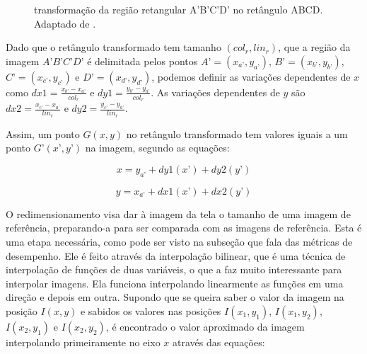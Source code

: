 
\begin{figure}[h]
  \centering
  \hfill
  \caption{transformação da região retangular A'B'C'D' no retângulo ABCD. Adaptado de \cite{inspect}.}
  \label{redimens}
\end{figure} 


Dado que o retângulo transformado tem tamanho $(col_r,lin_r)$, que a região da imagem $A’B’C’D’$ é delimitada pelos pontos $A’ = (x_{a’},y_{a’})$, $B’ = (x_{b’},y_{b’})$, $C’ = (x_{c’},y_{c’})$ e $D’ = (x_{d’},y_{d’})$, podemos definir as variações dependentes de $x$ como $dx1 = \frac{x_{b’}-x_{a’}}{col_r}$ e $dy1 = \frac{y_{b’}-y_{a’}}{col_r}$. As variações dependentes de $y$ são $dx2 = \frac{x_{c’}-x_{a’}}{lin_r}$ e $dy2 = \frac{y_{c’}-y_{a’}}{lin_r}$.


Assim, um ponto $G(x,y)$ no retângulo transformado tem valores iguais a um ponto $G’(x’,y’)$ na imagem, segundo as equações:

$$ x = y_{a’} + dy1(x’) + dy2(y’) $$

$$ y = x_{a’} + dx1(x’) + dx2(y’) $$

O redimensionamento visa dar à imagem da tela o tamanho de uma imagem de referência, preparando-a para ser comparada com as imagens de referência. Esta é uma etapa necessária, como pode ser visto na subseção que fala das métricas de desempenho. Ele é feito através da interpolação bilinear, que é uma técnica de interpolação de funções de duas variáveis, o que a faz muito interessante para interpolar imagens.
Ela funciona interpolando linearmente as funções em uma direção e depois em outra. Supondo que se queira saber o valor da imagem na posição $I(x,y)$ e sabidos os valores nas posições $I(x_1,y_1)$, $I(x_1,y_2)$, $I(x_2,y_1)$ e $I(x_2,y_2)$, é encontrado o valor aproximado da imagem interpolando primeiramente no eixo $x$ através das equações:

